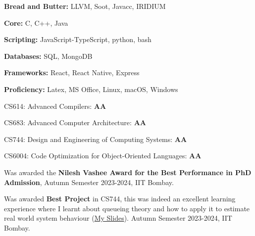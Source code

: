 \documentclass[10pt,a4paper,ragged2e]{altacv}
\begin{document}







{\bf Bread and Butter:} LLVM, Soot, Javacc, IRIDIUM
\smallskip

{\bf Core:} C, C++, Java
\smallskip

{\bf Scripting:} JavaScript-TypeScript, python, bash
\smallskip

{\bf Databases:} SQL, MongoDB
\smallskip

{\bf Frameworks:} React, React Native, Express
\smallskip

{\bf Proficiency:} Latex, MS Office, Linux, macOS, Windows
\smallskip

\smallskip
CS614: Advanced Compilers: \textbf{AA}
\smallskip

CS683: Advanced Computer Architecture: \textbf{AA}
\smallskip

CS744: Design and Engineering of Computing Systems: \textbf{AA}
\smallskip

CS6004: Code Optimization for Object-Oriented Languages: \textbf{AA}


Was awarded the \textbf{Nilesh Vashee Award for the Best Performance in PhD Admission}, Autumn Semester 2023-2024, IIT Bombay.
\smallskip



Was awarded \textbf{Best Project} in CS744, this was indeed an excellent learning experience where I learnt about queueing theory and how to apply it to estimate real world system behaviour (\href{https://www.dropbox.com/scl/fi/jn929eapbmib7v975u4im/DECServer_23D0361.pdf?rlkey=3ia4omysij0r0ozvz9d5dvk76&e=1&dl=0}{My Slides}). Autumn Semester 2023-2024, IIT Bombay.
\smallskip
\end{document}
